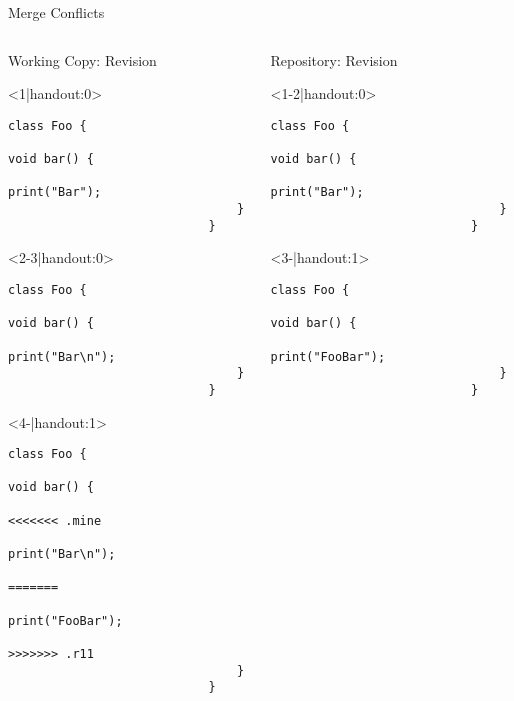 \begin{frame}[fragile]{Merge Conflicts}	
	\begin{columns}[T, onlytextwidth]
		\begin{column}{0.6\linewidth}
			\begin{columns}[T]
				\begin{column}{0.5\linewidth}
					Working Copy: Revision \only<4>{\emph{11$^*$}}\\[2mm]
					
					\begin{onlyenv}<1|handout:0>
						\begin{lstlisting}[style=java,basicstyle=\fontfamily{pcr}\small\selectfont,numbers=none,escapechar=|]
							class Foo {
								void bar() {
									print("Bar");
								}
							}	
						\end{lstlisting}
					\end{onlyenv}
					\begin{onlyenv}
						\begin{lstlisting}[style=java,basicstyle=\fontfamily{pcr}\small\selectfont,numbers=none,escapechar=|]
							class Foo {
								void bar() {
									print("Bar\n");
								}
							}
						\end{lstlisting}
					\end{onlyenv}
					\begin{onlyenv}
						\begin{lstlisting}[style=java,basicstyle=\fontfamily{pcr}\small\selectfont,numbers=none,escapechar=|]
							class Foo {
								void bar() {		
									<<<<<<< .mine
									print("Bar\n");
									=======
									print("FooBar");
									>>>>>>> .r11
								}
							}	
						\end{lstlisting}
					\end{onlyenv}
				\end{column}
				\begin{column}{0.5\linewidth}					
					Repository: Revision \only<3->{\emph{11}}
					
					\begin{onlyenv}
						\begin{lstlisting}[style=java,basicstyle=\fontfamily{pcr}\small\selectfont,numbers=none,escapechar=|]
							class Foo {
								void bar() {
									print("Bar");
								}
							}
						\end{lstlisting}
					\end{onlyenv}
					\begin{onlyenv}
						\begin{lstlisting}[style=java,basicstyle=\fontfamily{pcr}\small\selectfont,numbers=none,escapechar=|]
							class Foo {
								void bar() {
									print("FooBar");
								}
							}
						\end{lstlisting}
					\end{onlyenv}
				\end{column}
			\end{columns}
			

\end{column}
\end{columns}
\end{frame}
